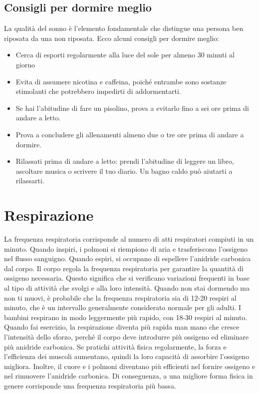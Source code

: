 \documentclass{article}
\begin{document}
\subsection{Consigli per dormire meglio}
La qualità del sonno è l'elemento fondamentale che distingue una persona ben riposata da una non riposata. Ecco alcuni consigli per dormire meglio:
\begin{itemize}
    \item Cerca di esporti regolarmente alla luce del sole per almeno 30 minuti al giorno
    \item Evita di assumere nicotina e caffeina, poiché entrambe sono sostanze stimolanti che potrebbero impedirti di addormentarti.
    \item Se hai l'abitudine di fare un pisolino, prova a evitarlo fino a sei ore prima di andare a letto.
    \item Prova a concludere gli allenamenti almeno due o tre ore prima di andare a dormire.
    \item Rilassati prima di andare a letto: prendi l'abitudine di leggere un libro, ascoltare musica o scrivere il tuo diario.
    Un bagno caldo può aiutarti a rilassarti.
\end{itemize}


\section{Respirazione}
La frequenza respiratoria corrisponde al numero di atti respiratori compiuti in un minuto. Quando inspiri, i polmoni si riempiono di aria e trasferiscono l'ossigeno nel flusso sanguigno.
Quando espiri, si occupano di espellere l'anidride carbonica dal corpo.
Il corpo regola la frequenza respiratoria per garantire la quantità di ossigeno necessaria.
Questo significa che si verificano variazioni frequenti in base al tipo di attività che svolgi e alla
loro intensità.
Quando non stai dormendo ma non ti muovi, è probabile che la frequenza respiratoria sia di 12-20 respiri al minuto, che è un intervallo generalmente considerato normale per gli adulti. I bambini respirano in modo leggermente più rapido, con 18-30 respiri al minuto.
Quando fai esercizio, la respirazione diventa più rapida man mano che cresce l'intensità dello sforzo, perché il corpo deve introdurre più ossigeno ed eliminare più anidride carbonica.
Se pratichi attività fisica regolarmente, la forza e l'efficienza dei muscoli aumentano, quindi la loro capacità di assorbire l'ossigeno migliora. Inoltre, il cuore e i polmoni diventano più efficienti nel fornire ossigeno e nel rimuovere l'anidride carbonica. Di conseguenza, a una migliore forma fisica in genere corrisponde una frequenza respiratoria più bassa.
\end{document}
